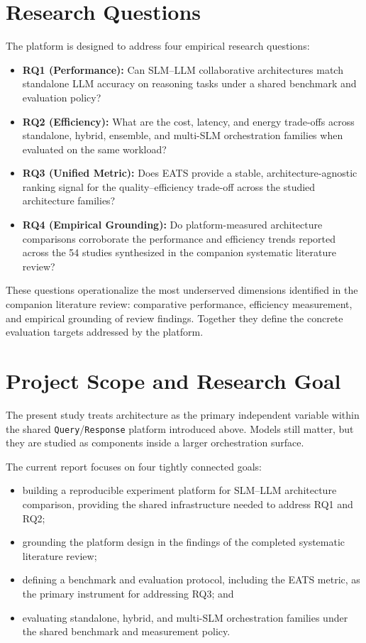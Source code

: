 \section{Research Questions}
\label{sec:rqs}

The platform is designed to address four empirical research questions:

\begin{itemize}
    \item \textbf{RQ1 (Performance):} Can SLM--LLM collaborative architectures match standalone LLM accuracy on reasoning tasks under a shared benchmark and evaluation policy?

    \item \textbf{RQ2 (Efficiency):} What are the cost, latency, and energy trade-offs across standalone, hybrid, ensemble, and multi-SLM orchestration families when evaluated on the same workload?

    \item \textbf{RQ3 (Unified Metric):} Does EATS provide a stable, architecture-agnostic ranking signal for the quality--efficiency trade-off across the studied architecture families?

    \item \textbf{RQ4 (Empirical Grounding):} Do platform-measured architecture comparisons corroborate the performance and efficiency trends reported across the 54 studies synthesized in the companion systematic literature review?
\end{itemize}

These questions operationalize the most underserved dimensions identified in the companion literature review: comparative performance, efficiency measurement, and empirical grounding of review findings. Together they define the concrete evaluation targets addressed by the platform.

\section{Project Scope and Research Goal}

The present study treats architecture as the primary independent variable within the shared \texttt{Query}/\texttt{Response} platform introduced above. Models still matter, but they are studied as components inside a larger orchestration surface.

The current report focuses on four tightly connected goals:

\begin{itemize}
    \item building a reproducible experiment platform for SLM--LLM architecture comparison, providing the shared infrastructure needed to address RQ1 and RQ2;
    \item grounding the platform design in the findings of the completed systematic literature review;
    \item defining a benchmark and evaluation protocol, including the EATS metric, as the primary instrument for addressing RQ3; and
    \item evaluating standalone, hybrid, and multi-SLM orchestration families under the shared benchmark and measurement policy.
\end{itemize}

